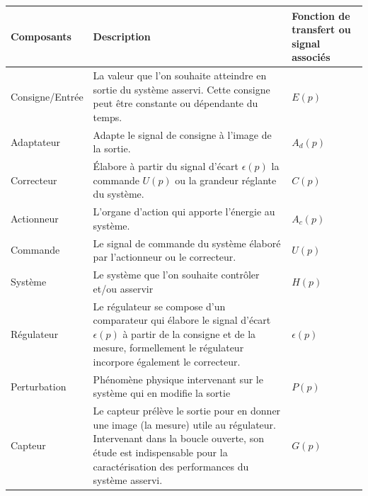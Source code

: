 \begin{table}[!h]
    \centering
    \begin{tabular}{@{}P{3cm}m{8.5cm}P{3cm}@{}}
        \toprule
Composants      & Description & Fonction de transfert ou signal associés\\
        \midrule
Consigne/Entrée & La valeur que l'on souhaite atteindre en sortie 
                  du système asservi. Cette consigne peut être constante 
                  ou dépendante du temps. 
                & $E(p)$                                                \\
Adaptateur      & Adapte le signal de consigne à l'image de la sortie.
                & $A_d(p)$                                              \\
Correcteur      & \'Elabore à partir du signal d'écart $\epsilon(p)$ 
                  la commande $U(p)$ ou la grandeur réglante du système.
                & $C(p)$                                                \\
Actionneur      & L'organe d'action qui apporte l'énergie au système.
                & $A_c(p)$                                              \\
Commande        & Le signal de commande du système élaboré par l'actionneur 
		                  ou le correcteur.
                & $U(p)$                                                \\
Système         & Le système que l'on souhaite contrôler et/ou asservir
                & $H(p)$                                                \\
Régulateur      & Le régulateur se compose d'un comparateur qui élabore le 
                  signal d'écart $\epsilon(p)$ à partir de la consigne et de 
                  la mesure, formellement le régulateur incorpore 
                  également le correcteur.
                & $\epsilon(p)$                                         \\
Perturbation    & Phénomène physique intervenant sur le système qui 
                  en modifie la sortie
                & $P(p)$                                                \\
Capteur         &  Le capteur prélève le sortie pour en donner une 
                   image (la mesure) utile au régulateur. 
                   Intervenant dans la boucle ouverte, son étude 
                   est indispensable pour la caractérisation des 
                   performances du système asservi.
                & $G(p)$                                                \\

\end{tabular}
\end{table}
